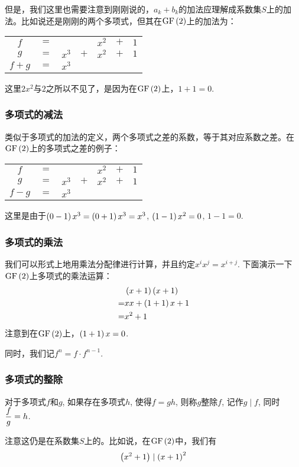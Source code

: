 但是，我们这里也需要注意到刚刚说的，$a_k+b_k$的加法应理解成系数集$S$上的加法。比如说还是刚刚的两个多项式，但其在$\mathrm{GF}\left( {2}\right)$上的加法为：
\begin{table}[H]
    \centering
    \begin{tabular}{ccrcrcr}
        $f$&$=$&&&$x^2$&$+$&$1$\\
        $g$&$=$&$x^3$&$+$&$x^2$&$+$&$1$\\\hline
        $f+g$&$=$&$x^3$&&&&
    \end{tabular}
\end{table}

这里$2x^2$与$2$之所以不见了，是因为在$\mathrm{GF}\left( {2}\right)$上，$1+1=0$.
\subsubsection{多项式的减法}
类似于多项式的加法的定义，两个多项式之差的系数，等于其对应系数之差。在$\mathrm{GF}\left( {2}\right)$上的多项式之差的例子：
\begin{table}[H]
    \centering
    \begin{tabular}{ccrcrcr}
        $f$&$=$&&&$x^2$&$+$&$1$\\
        $g$&$=$&$x^3$&$+$&$x^2$&$+$&$1$\\\hline
        $f-g$&$=$&$x^3$&&&&
    \end{tabular}
\end{table}

这里是由于$\left( {0-1}\right)x^3=\left( {0+1}\right)x^3=x^3$, $\left( {1-1}\right)x^2=0$, $1-1=0$.
\subsubsection{多项式的乘法}
我们可以形式上地用乘法分配律进行计算，并且约定$x^ix^j=x^{i+j}$. 下面演示一下$\mathrm{GF}\left( {2}\right)$上多项式的乘法运算：
\begin{align*}
    &\left( {x+1}\right)\left( {x+1}\right)\\
    =&xx+\left( {1+1}\right)x+1\\
    =&x^2+1
\end{align*}
注意到在$\mathrm{GF}\left( {2}\right)$上，$\left( {1+1}\right)x=0$.\par
同时，我们记$f^n=f\cdot f^{n-1}$.
\subsubsection{多项式的整除}
对于多项式$f$和$g$, 如果存在多项式$h$, 使得$f=gh$, 则称$g$整除$f$, 记作$g\mid f$, 同时$\displaystyle \frac{f}{g}=h$.\par
注意这仍是在系数集$S$上的。比如说，在$\mathrm{GF}\left( {2}\right)$中，我们有
\[\left( {x^2+1}\right)\mid\left( {x+1}\right)^2\]

